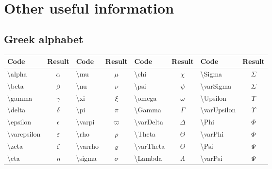 \section{Other useful information}

\subsection{Greek alphabet}

\begin{center}
\begin{tabular}{|l|c||l|c|l|c||l|c|} \hline
Code                        & Result            & Code                        & Result      & Code                        & Result          & Code                        & Result          \\ \hline \hline
\textbackslash alpha        & $\alpha$          & \textbackslash mu           & $\mu$       & \textbackslash chi          & $\chi$          & \textbackslash Sigma        & $\Sigma$        \\ \hline
\textbackslash beta         & $\beta$           & \textbackslash nu           & $\nu$       & \textbackslash psi          & $\psi$          & \textbackslash varSigma     & $\varSigma$     \\ \hline
\textbackslash gamma        & $\gamma$          & \textbackslash xi           & $\xi$       & \textbackslash omega        & $\omega$        & \textbackslash Upsilon      & $\Upsilon$      \\ \hline
\textbackslash delta        & $\delta$          & \textbackslash pi           & $\pi$       & \textbackslash Gamma        & $\Gamma$        & \textbackslash varUpsilon   & $\varUpsilon$   \\ \hline
\textbackslash epsilon      & $\epsilon$        & \textbackslash varpi        & $\varpi$    & \textbackslash varDelta     & $\varDelta$     & \textbackslash Phi          & $\Phi$          \\ \hline
\textbackslash varepsilon   & $\varepsilon$     & \textbackslash rho          & $\rho$      & \textbackslash Theta        & $\Theta$        & \textbackslash varPhi       & $\varPhi$       \\ \hline
\textbackslash zeta         & $\zeta$           & \textbackslash varrho       & $\varrho$   & \textbackslash varTheta     & $\varTheta$     & \textbackslash Psi          & $\Psi$          \\ \hline
\textbackslash eta          & $\eta$            & \textbackslash sigma        & $\sigma$    & \textbackslash Lambda       & $\Lambda$       & \textbackslash varPsi       & $\varPsi$       \\ \hline

\end{tabular}
\end{center}
